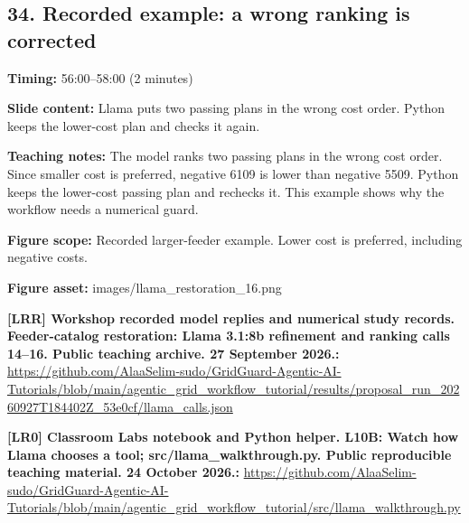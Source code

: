 \documentclass[10pt,letterpaper]{article}
\begin{document}
\subsection*{34. Recorded example: a wrong ranking is corrected}
\textbf{Timing:} 56:00--58:00 (2 minutes)\par
\textbf{Slide content:} Llama puts two passing plans in the wrong cost order.
Python keeps the lower-cost plan and checks it again.\par
\textbf{Teaching notes:} The model ranks two passing plans in the wrong cost order. Since smaller cost is preferred, negative 6109 is lower than negative 5509. Python keeps the lower-cost passing plan and rechecks it. This example shows why the workflow needs a numerical guard.\par
\textbf{Figure scope:} Recorded larger-feeder example. Lower cost is preferred, including negative costs.\par
\textbf{Figure asset:} images/llama\_restoration\_16.png\par
\textbf{[LRR] Workshop recorded model replies and numerical study records. Feeder-catalog restoration: Llama 3.1:8b refinement and ranking calls 14--16. Public teaching archive. 27 September 2026.:} \href{https://github.com/AlaaSelim-sudo/GridGuard-Agentic-AI-Tutorials/blob/main/agentic_grid_workflow_tutorial/results/proposal_run_20260927T184402Z_53e0cf/llama_calls.json}{\small\ttfamily https:/\allowbreak{}/\allowbreak{}github.\allowbreak{}com/\allowbreak{}AlaaSelim-\allowbreak{}sudo/\allowbreak{}GridGuard-\allowbreak{}Agentic-\allowbreak{}AI-\allowbreak{}Tutorials/\allowbreak{}blob/\allowbreak{}main/\allowbreak{}agentic\_\allowbreak{}grid\_\allowbreak{}workflow\_\allowbreak{}tutorial/\allowbreak{}results/\allowbreak{}proposal\_\allowbreak{}run\_\allowbreak{}20260927T184402Z\_\allowbreak{}53e0cf/\allowbreak{}llama\_\allowbreak{}calls.\allowbreak{}json}\par
\textbf{[LR0] Classroom Labs notebook and Python helper. L10B: Watch how Llama chooses a tool; src/llama\_walkthrough.py. Public reproducible teaching material. 24 October 2026.:} \href{https://github.com/AlaaSelim-sudo/GridGuard-Agentic-AI-Tutorials/blob/main/agentic_grid_workflow_tutorial/src/llama_walkthrough.py}{\small\ttfamily https:/\allowbreak{}/\allowbreak{}github.\allowbreak{}com/\allowbreak{}AlaaSelim-\allowbreak{}sudo/\allowbreak{}GridGuard-\allowbreak{}Agentic-\allowbreak{}AI-\allowbreak{}Tutorials/\allowbreak{}blob/\allowbreak{}main/\allowbreak{}agentic\_\allowbreak{}grid\_\allowbreak{}workflow\_\allowbreak{}tutorial/\allowbreak{}src/\allowbreak{}llama\_\allowbreak{}walkthrough.\allowbreak{}py}\par
\par\medskip
\end{document}
